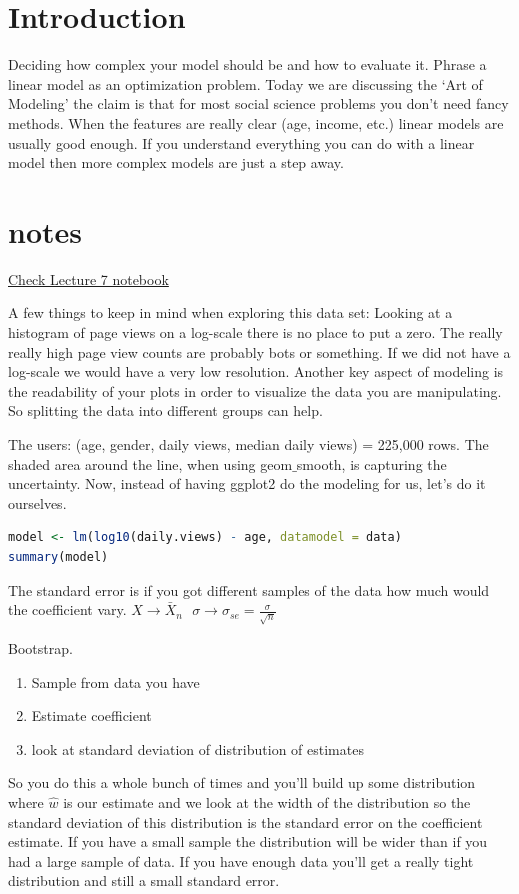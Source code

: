 
\section{Introduction}
Deciding how complex your model should be and how to evaluate it. Phrase a linear model as an optimization problem.
Today we are discussing the ‘Art of Modeling’ 
the claim is that for most social science problems you don’t need fancy methods. When the features are really clear (age, income, etc.) linear models are usually good enough.
If you understand everything you can do with a linear model then more complex models are just a step away.
\section{notes}
 

 \href{https://github.com/jhofman/msd2019/blob/master/lectures/lecture_7/linear_models.ipynb}{Check Lecture 7 notebook} 
 
A few things to keep in mind when exploring this data set: Looking at a histogram of page views on a log-scale there is no place to put a zero. The really really high page view counts are probably bots or something. If we did not have a log-scale we would have a very low resolution.
Another key aspect of modeling is the readability of your plots in order to visualize the data you are manipulating.
So splitting the data into different groups can help. 

The users: (age, gender, daily views, median daily views) = 225,000 rows. 
The shaded area around the line, when using geom$\_$smooth, is capturing the uncertainty.
Now, instead of having ggplot2 do the modeling for us, let's do it ourselves.
\begin{lstlisting}[language=R]
model <- lm(log10(daily.views) - age, datamodel = data)
summary(model)
\end{lstlisting}

The standard error is if you got different samples of the data how much would the coefficient vary.
$X \rightarrow \bar{X}_n ~~~ \sigma \rightarrow \sigma_{se} = \frac{\sigma}{\sqrt{n}}$

Bootstrap.
\begin{enumerate}
  \item Sample from data you have
  \item Estimate coefficient
  \item look at standard deviation of distribution of estimates
\end{enumerate}
So you do this a whole bunch of times and you'll build up some distribution  where $\hat{w}$ is our estimate and we look at the width of the distribution so the standard deviation of this distribution is the standard error on the coefficient estimate. If you have a small sample the distribution will be wider than if you had a large sample of data.
If you have enough data you'll get a really tight distribution and still a small standard error. 

